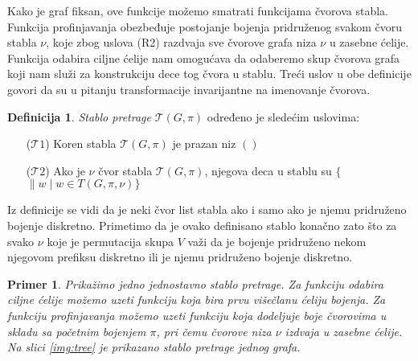 \documentclass[12pt,oneside]{memoir}
\newtheorem{example}{Primer}
\theoremstyle{definition}
\newtheorem*{definition}{Definicija}
\begin{document}
  Kako je graf fiksan, ove funkcije možemo smatrati funkcijama čvorova stabla.
  Funkcija profinjavanja obezbeđuje postojanje bojenja pridruženog svakom čvoru
  stabla $\nu$, koje zbog uslova (R2) razdvaja sve čvorove grafa niza $\nu$ u
  zasebne ćelije. Funkcija odabira ciljne ćelije nam omogućava da odaberemo
  skup čvorova grafa koji nam služi za konstrukciju dece tog čvora u stablu.
  Treći uslov u obe definicije govori da su u pitanju transformacije
  invarijantne na imenovanje čvorova.

  \begin{definition}
      \emph{Stablo pretrage} $\mathcal{T}(G, \pi)$ određeno je sledećim uslovima:
  
   \begin{itemize}
       \item[($\mathcal{T}1$)] Koren stabla $\mathcal{T}(G, \pi)$ je prazan niz $()$
       \item[($\mathcal{T}2$)] Ako je $\nu$ čvor stabla $\mathcal{T}(G, \pi)$, njegova deca u
     	stablu su $\{$\nu$ \| w \mid w \in T(G, \pi, \nu)\}$
   \end{itemize}
  \end{definition}

  Iz definicije se vidi da je neki čvor list stabla ako i samo ako je njemu
  pridruženo bojenje diskretno. Primetimo da je ovako definisano stablo konačno
  zato što za svako $\nu$ koje je permutacija skupa $V$ važi da je bojenje
  pridruženo nekom njegovom prefiksu diskretno ili je njemu pridruženo bojenje
  diskretno.

  \begin{example}
	  Prikažimo jedno jednostavno stablo pretrage. Za funkciju odabira ciljne
	  ćelije možemo uzeti funkciju koja bira prvu višečlanu ćeliju bojenja.
	  Za funkciju profinjavanja možemo uzeti funkciju koja dodeljuje boje
	  čvorovima u skladu sa početnim bojenjem $\pi$, pri čemu čvorove niza
	  $\nu$ izdvaja u zasebne ćelije. Na slici \ref{img:tree} je prikazano
	  stablo pretrage jednog grafa.
  \end{example}
\end{document}
